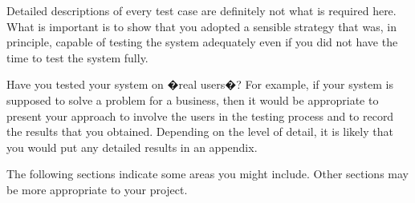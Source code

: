 Detailed descriptions of every test case are definitely not what is required here. What is important is to show that you adopted a sensible strategy that was, in principle, capable of testing the system adequately even if you did not have the time to test the system fully.

Have you tested your system on �real users�? For example, if your system is supposed to solve a problem for a business, then it would be appropriate to present your approach to involve the users in the testing process and to record the results that you obtained. Depending on the level of detail, it is likely that you would put any detailed results in an appendix.

The following sections indicate some areas you might include. Other sections may be more appropriate to your project. 
